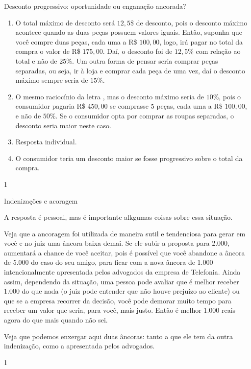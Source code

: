 \begin{resposta}{Desconto progressivo: oportunidade ou enganação ancorada?}
{
  \begin{enumerate}
    \item O total máximo de desconto será $12{,}5$\$ de desconto, pois o desconto máximo acontece quando as duas peças possuem valores iguais. Então, suponha que você compre duas peças, cada uma a R\$ $100{,}00$, logo, irá pagar no total da compra o valor de R\$ $175{,}00$. Daí, o desconto foi de $12{,}5$\% com relação ao total e não de $25$\%. Um outra forma de pensar seria comprar peças separadas, ou seja, ir à loja e comprar cada peça de uma vez, daí o desconto máximo sempre seria de $15$\%.
    \item O mesmo raciocínio da letra , mas o desconto máximo seria de $10$\%, pois o consumidor pagaria R\$ $450{,}00$ se comprasse 5 peças, cada uma a R\$ $100{,}00$, e não de $50$\%. Se o consumidor opta por comprar as roupas separadas, o desconto seria maior neste caso.
    \item Resposta individual.
    \item O consumidor teria um desconto maior se fosse progressivo sobre o total da compra.
  \end{enumerate}  
}{1}
\end{resposta}

\begin{resposta}{Indenizações e acoragem}
{
  A resposta é pessoal, mas é importante alkgumas coisas sobre essa situação. 

  Veja que a ancoragem foi utilizada de maneira sutil e tendenciosa para gerar em você e no juiz uma âncora baixa demai. Se ele subir a proposta para 2.000, aumentará a chance de você aceitar, pois é possível que você abandone a âncora de 5.000 do caso do seu amigo, para ficar com a nova âncora de 1.000 intencionalmente apresentada pelos advogados da empresa de Telefonia. Ainda assim, dependendo da situação, uma pessoa pode avaliar que é melhor receber 1.000 do que nada (o juiz pode entender que não houve prejuízo ao cliente) ou que se a empresa recorrer da decisão, você pode demorar muito tempo para receber um valor que seria, para você, mais justo. Então é melhor 1.000 reais agora do que mais quando não sei.

  Veja que podemos enxergar aqui duas âncoras: tanto a que ele tem da outra indenização, como a apresentada pelos advogados.
}{1}
\end{resposta}

